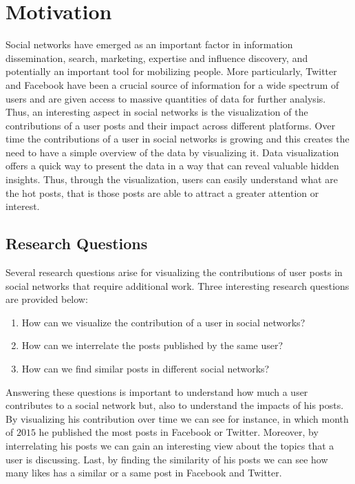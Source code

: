 \newpage
\section{Motivation}


Social networks have emerged as an important factor in information dissemination, search, marketing, expertise and influence discovery, and potentially an important tool for mobilizing people. More particularly, Twitter and Facebook have been a crucial source of information for a wide spectrum of users and are given access to massive quantities of data for further analysis. Thus, an interesting aspect in social networks is the visualization of the contributions of a user posts and their impact across different platforms. Over time the contributions of a user in social networks is growing and this creates the need to have a simple overview of the data by visualizing it. Data visualization offers a quick way to present the data in a way that can reveal valuable hidden insights. Thus, through the visualization, users can easily understand what are the hot posts, that is those posts are able to attract a greater attention or interest.


\subsection{Research Questions}


Several research questions arise for visualizing the contributions of user posts in social networks that require additional work. Three interesting research questions are provided below:


\begin{enumerate}
\item How can we visualize the contribution of a user in social networks?
\item How can we interrelate the posts published by the same user?
\item How can we find similar posts in different social networks?
\end{enumerate}


Answering these questions is important to understand how much a user contributes to a social network but, also to understand the impacts of his posts. By visualizing his contribution over time we can see for instance, in which month of $2015$  he published  the most posts in Facebook or Twitter. Moreover, by interrelating his posts we can gain an interesting view about the topics that a user is discussing. Last, by finding the similarity of his posts we can see how many likes has a similar or a same post in Facebook and Twitter.



